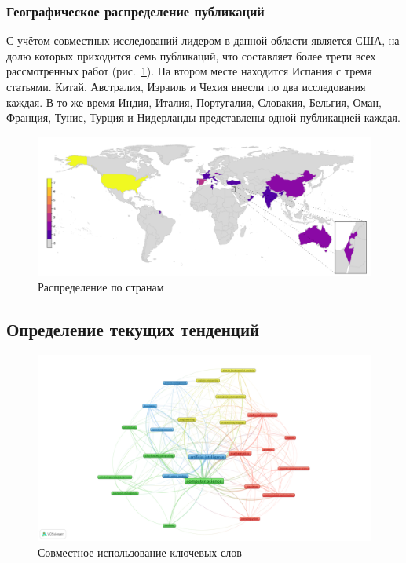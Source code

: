 \documentclass[%
]{ittmm}
\begin{document}
\subsubsection{Географическое распределение публикаций}

С учётом совместных исследований лидером в данной области является США,
на долю которых приходится семь публикаций,
что составляет более трети всех рассмотренных работ (рис.~\ref{fig:countries-of-origin}).
На втором месте находится Испания с тремя статьями.
Китай, Австралия, Израиль и Чехия внесли по два исследования каждая.
В то же время Индия, Италия, Португалия, Словакия, Бельгия, Оман, Франция, Тунис, Турция и Нидерланды представлены одной публикацией каждая.

\begin{figure}
  \centering
  \includegraphics[width=0.8\linewidth]{countries_of_origin.png}
  \caption{Распределение по странам}
  \label{fig:countries-of-origin}
\end{figure}

\subsection{Определение текущих тенденций}

\begin{figure}
  \centering
  \includegraphics[width=0.8\linewidth]{co-occurence.png}
  \caption{Совместное использование ключевых слов}
  \label{fig:co-occurence}
\end{figure}
\end{document}
